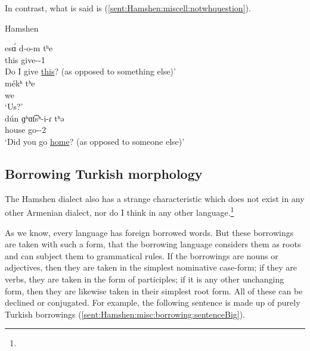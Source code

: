 In contrast, what is said is (\ref{sent:Hamshen:miscell:notwhquestion}). 

\begin{exe}
	\ex Hamshen\label{sent:Hamshen:miscell:notwhquestion}
	\begin{xlist}
		\ex \gll es\'ɑ d-o-m tʰe \\
		this give-{\thgloss}-1{\sg} {\q} \\
		\trans Do I give \underline{this}? (as opposed to something else)' \\
		\ex \gll m\'ekʰ tʰe \\
		we {\q} \\
		\trans `Us?' \\
		\ex \gll d\'un ɡʰɑt͡sʰ-i-ɾ tʰə \\
		house go-{\pst}-2{\sg} {\q} \\
		\trans `Did you go \underline{home}? (as opposed to someone else)'\\
		
		
	\end{xlist}
\end{exe}

\subsection{Borrowing Turkish morphology}

The Hamshen dialect also has a strange characteristic which does not exist in any other Armenian dialect, nor do I think in any other language.\footnote{}


As we know, every language has foreign borrowed words. But these borrowings are taken with such a form, that the borrowing language considers them as roots and can subject them to grammatical rules. If the borrowings are nouns or adjectives, then they are taken in the simplest nominative case-form; if they are verbs, they are taken in the form of participles; if it is any other unchanging form, then they are likewise taken in their simplest root form. All of these can be declined or conjugated. For example, the following sentence is made up of purely Turkish borrowings (\ref{sent:Hamshen:misc:borrowing:sentenceBig}). 

